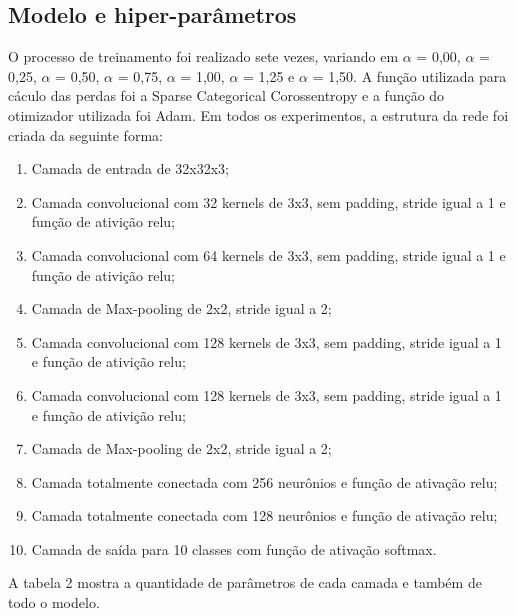 \subsection{Modelo e hiper-parâmetros} \label{secao12}
O processo de treinamento foi realizado sete vezes, variando em $\alpha$ = 0,00, $\alpha$ = 0,25, $\alpha$ = 0,50, $\alpha$ = 0,75, $\alpha$ = 1,00, $\alpha$ = 1,25 e $\alpha$ = 1,50. A função utilizada para cáculo das perdas foi a Sparse Categorical Corossentropy e a função do otimizador utilizada foi Adam. Em todos os experimentos, a estrutura da rede foi criada da seguinte forma:

\begin{enumerate}
   \item Camada de entrada de 32x32x3;
   \item Camada convolucional com 32 kernels de 3x3, sem padding, stride igual a 1 e função de ativição relu;
   \item Camada convolucional com 64 kernels de 3x3, sem padding, stride igual a 1 e função de ativição relu;
   \item Camada de Max-pooling de 2x2, stride igual a 2;
   \item Camada convolucional com 128 kernels de 3x3, sem padding, stride igual a 1 e função de ativição relu;
   \item Camada convolucional com 128 kernels de 3x3, sem padding, stride igual a 1 e função de ativição relu;
   \item Camada de Max-pooling de 2x2, stride igual a 2;
   \item Camada totalmente conectada com 256 neurônios e função de ativação relu;
   \item Camada totalmente conectada com 128 neurônios e função de ativação relu;
   \item Camada de saída para 10 classes com função de ativação softmax.
\end{enumerate}

A tabela 2 mostra a quantidade de parâmetros de cada camada e também de todo o modelo.

